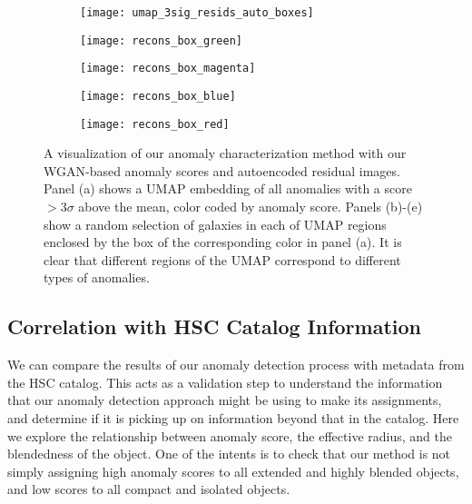 \documentclass[fleqn,usenatbib,useAMS]{mnras}
\begin{document}
\begin{figure*}
\begin{subfigure}{0.75\textwidth}
  \centering
  \texttt{[image: umap\_3sig\_resids\_auto\_boxes]}  
  \vspace{-2em}
  \caption{}
  \label{fig:umap_3sig_boxes}
\end{subfigure}

\begin{subfigure}{.45\textwidth}
  \centering
  \texttt{[image: recons\_box\_green]}  
  \caption{}
  \label{fig:recons_green}
\end{subfigure}
\hspace{2em}
\begin{subfigure}{.45\textwidth}
  \centering
  \texttt{[image: recons\_box\_magenta]}  
  \caption{}
  \label{fig:recons_magenta}
\end{subfigure}

\begin{subfigure}{.45\textwidth}
  \centering
  \texttt{[image: recons\_box\_blue]}  
  \caption{}
  \label{fig:recons_blue}
\end{subfigure}
\hspace{2em}
\begin{subfigure}{.45\textwidth}
  \centering
  \texttt{[image: recons\_box\_red]}  
  \caption{}
  \label{fig:recons_red}
\end{subfigure}

\vspace{0cm}
\caption{A visualization of our anomaly characterization method with our WGAN-based anomaly scores and autoencoded residual images. Panel (a) shows a UMAP embedding of all anomalies with a score $>3\sigma$ above the mean, color coded by anomaly score. Panels (b)-(e) show a random selection of galaxies in each of UMAP regions enclosed by the box of the corresponding color in panel (a). It is clear that different regions of the UMAP correspond to different types of anomalies.}
\label{fig:boxes}
\end{figure*}


\subsection{Correlation with HSC Catalog Information}

We can compare the results of our anomaly detection process with metadata from the HSC catalog.
This acts as a validation step to understand the information that our anomaly detection approach might be using to make its assignments, and determine if it is picking up on information beyond that in the catalog.
Here we explore the relationship between anomaly score, the effective radius, and the blendedness of the object.
One of the intents is to check that our method is not simply assigning high anomaly scores to all extended and highly blended objects, and low scores to all compact and isolated objects.
\end{document}
